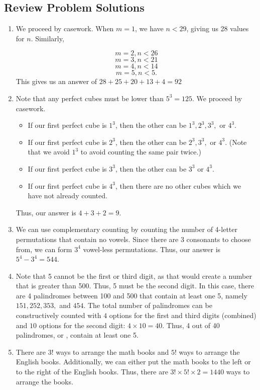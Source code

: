 \documentclass[12pt, letterpaper]{article}
\begin{document}
\newpage
\subsection{Review Problem Solutions}

\begin{enumerate}
    \item We proceed by casework. When $m=1$, we have $n < 29$, giving us 28 values for $n$. Similarly,

        $$m=2, n < 26$$
        $$m=3, n < 21$$
        $$m=4, n < 14$$
        $$m=5, n < 5.$$
    This gives us an answer of $28+25+20+13+4=\boxed{92}$
    \item Note that any perfect cubes must be lower than $5^3=125$. We proceed by casework.
    \begin{itemize}
        \item If our first perfect cube is $1^3$, then the other can be $1^3, 2^3, 3^3,$ or $4^3$.
        \item If our first perfect cube is $2^3$, then the other can be $2^3, 3^3,$ or $4^3$. (Note that we avoid $1^3$ to avoid counting the same pair twice.)
        \item If our first perfect cube is $3^3$, then the other can be $3^3$ or $4^3$.
        \item If our first perfect cube is $4^3$, then there are no other cubes which we have not already counted.
    \end{itemize}
    Thus, our answer is $4+3+2=\boxed{9}$.
    \item We can use complementary counting by counting the number of 4-letter permutations that contain no vowels. Since there are 3 consonants to choose from, we can form $3^4$ vowel-less permutations. Thus, our answer is $5^4-3^4 = \boxed{544}$.
    \item Note that 5 cannot be the first or third digit, as that would create a number that is greater than 500. Thus, 5 must be the second digit. In this case, there are 4 palindromes between 100 and 500 that contain at least one 5, namely $151, 252, 353,$ and $454$.
    The total number of palindromes can be constructively counted with $4$ options for the first and third digits (combined) and $10$ options for the second digit: $4 \times 10 = 40$. Thus, 4 out of 40 palindromes, or , contain at least one 5.
    \item There are $3!$ ways to arrange the math books and $5!$ ways to arrange the English books. Additionally, we can either put the math books to the left or to the right of the English books. Thus, there are $3! \times 5! \times 2 = \boxed{1440}$ ways to arrange the books.
\end{enumerate}
\end{document}

